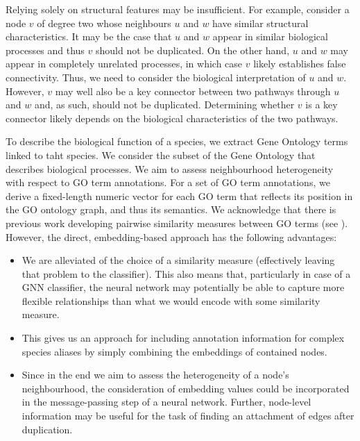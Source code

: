 \documentclass[
	fontsize=10pt, %
	twoside=true, %
	secnumdepth=1, %
  toc=indentunnumbered %
]{kaobook}
\begin{document}
Relying solely on structural features may be insufficient. For example, consider
a node $v$ of degree two whose neighbours $u$ and $w$ have similar structural
characteristics. It may be the case that $u$ and $w$ appear in similar
biological processes and thus $v$ should not be duplicated. On the other hand,
$u$ and $w$ may appear in completely unrelated processes, in which case $v$
likely establishes false connectivity. Thus, we need to consider the biological
interpretation of $u$ and $w$. However, $v$ may well also be a key connector
between two pathways through $u$ and $w$ and, as such, should not be duplicated.
Determining whether $v$ is a key connector likely depends on the biological
characteristics of the two pathways.

To describe the biological function of a species, we extract Gene Ontology terms
linked to taht species. We consider the subset of the Gene Ontology that
describes biological processes. We aim to assess neighbourhood heterogeneity
with respect to GO term annotations.
%
For a set of GO term annotations, we derive a fixed-length numeric
 vector for each GO term that reflects its position in the GO
ontology graph, and thus its semantics. We acknowledge that there is previous
work developing pairwise similarity measures between GO terms (see
). However, the direct, embedding-based approach has
the following advantages:
%
\begin{itemize}
\item We are alleviated of the choice of a similarity measure
  (effectively leaving that problem to the classifier). This also means that,
  particularly in case of a GNN classifier, the neural network may potentially
  be able to capture more flexible relationships than what we would encode with
  some similarity measure.
\item This gives us an approach for including annotation information for
  complex species aliases by simply combining the embeddings of contained nodes.
\item Since in the end we aim to assess the heterogeneity of a node's
  neighbourhood, the consideration of embedding values could be incorporated in
  the message-passing step of a neural network. Further,
  node-level information may be useful for the task of finding an attachment of
  edges after duplication.
\end{itemize}
\end{document}
